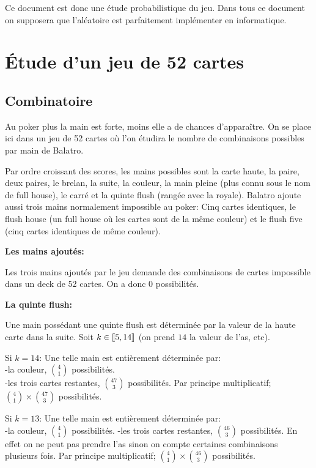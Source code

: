 \documentclass[10pt]{report}
\begin{document}
    Ce document est donc une étude probabilistique du jeu. 
    Dans tous ce document on supposera que l'aléatoire est parfaitement implémenter en informatique.

    \chapter{Étude d'un jeu de 52 cartes}
    
    \section{Combinatoire}

    Au poker plus la main est forte, moins elle a de chances d'apparaître.
    On se place ici dans un jeu de 52 cartes où l'on étudira le nombre de combinaisons possibles par main de Balatro.

    Par ordre croissant des scores, 
    les mains possibles sont la carte haute, la paire, deux paires, le brelan, la suite, la couleur, la main pleine (plus connu sous le nom de full house), le carré et la quinte flush (rangée avec la royale).
    Balatro ajoute aussi trois mains normalement impossible au poker: Cinq cartes identiques, le flush house (un full house où les cartes sont de la même couleur) et le flush five (cinq cartes identiques de même couleur).
    
    \textbf{Les mains ajoutés:}
    
    Les trois mains ajoutés par le jeu demande des combinaisons de cartes impossible dans un deck de 52 cartes.
    On a donc $0$ possibilités.

    \textbf{La quinte flush:}

    Une main possédant une quinte flush est déterminée par la valeur de la haute carte dans la suite.
    Soit $k \in [\![5, \space 14]\!]$ (on prend $14$ la valeur de l'as, etc).

    Si $k = 14$: \newline
    Une telle main est entièrement déterminée par: \\
    -la couleur, \(\binom{4}{1}\) possibilités. \\
    -les trois cartes restantes, \(\binom{47}{3}\) possibilités. \newline
    Par principe multiplicatif; $\binom{4}{1} \times \binom{47}{3}$ possibilités.
    
    Si $k = 13$: \newline
    Une telle main est entièrement déterminée par: \\
    -la couleur, \(\binom{4}{1}\) possibilités.
    -les trois cartes restantes, \(\binom{46}{3}\) possibilités. En effet on ne peut pas prendre l'as sinon on compte certaines combinaisons plusieurs fois.
    Par principe multiplicatif; $\binom{4}{1} \times \binom{46}{3}$ possibilités.
\end{document}
